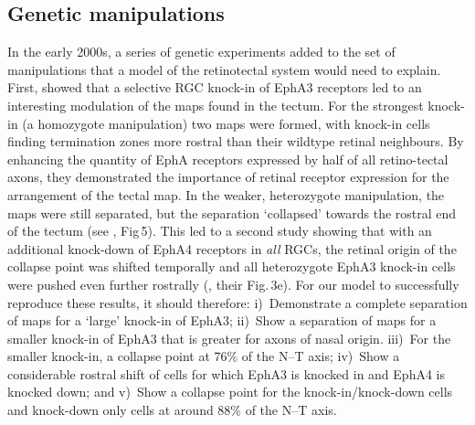 \documentclass[11pt, a4paper]{article}
\begin{document}
\subsection*{Genetic manipulations}

In the early 2000s, a series of genetic experiments added to the set of manipulations that a model of the retinotectal system would need to
explain. 
First, \citet{brown_topographic_2000} showed that a selective RGC knock-in of EphA3 receptors led to an interesting modulation of the maps found in the tectum. 
For the strongest knock-in (a homozygote manipulation) two maps were formed, with knock-in cells finding termination zones more rostral than their wildtype retinal neighbours. 
By enhancing the quantity of EphA receptors expressed by half of all retino-tectal axons, they demonstrated the importance of retinal receptor expression for the arrangement of the tectal map. 
In the weaker, heterozygote manipulation, the maps were still separated, but the separation `collapsed' towards the rostral end of the tectum (see \citet{brown_topographic_2000}, Fig\,5). 
This led to a second study showing that with an additional knock-down of EphA4 receptors in \emph{all} RGCs, the retinal origin of the collapse point was shifted temporally and all heterozygote EphA3 knock-in cells were pushed even further rostrally (\citet{reber_relative_2004}, their Fig.\,3e). 
For our model to successfully reproduce these results, it should therefore: i)~Demonstrate a complete separation of maps for a `large' knock-in of EphA3; ii)~Show a separation of maps for a smaller knock-in of EphA3 that is greater for axons of nasal origin. iii)~For the smaller knock-in, a collapse point at 76\% of the N--T axis; iv)~Show a considerable rostral shift of cells for which EphA3 is knocked in and EphA4 is knocked down; and v)~Show a collapse point for the knock-in/knock-down cells and knock-down only cells at around 88\% of the N--T axis.
\end{document}
